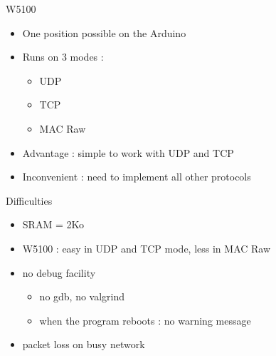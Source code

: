 \begin{frame} {W5100}
	\begin{itemize}
		\item One position possible on the Arduino
		\item Runs on 3 modes : 
		\begin{itemize}
			\item UDP
			\item TCP
			\item MAC Raw
		\end{itemize}
		\item Advantage : simple to work with UDP and TCP
		\item Inconvenient : need to implement all other protocols
	\end{itemize}
\end{frame}

\begin{frame} {Difficulties}
    \begin{itemize}
		\item SRAM = 2Ko
		\item W5100 : easy in UDP and TCP mode, less in MAC Raw
		\item no debug facility
		\begin{itemize}
			\item no gdb, no valgrind
			\item when the program reboots : no warning message
		\end{itemize}
		\item packet loss on busy network
    \end{itemize}
\end{frame}


